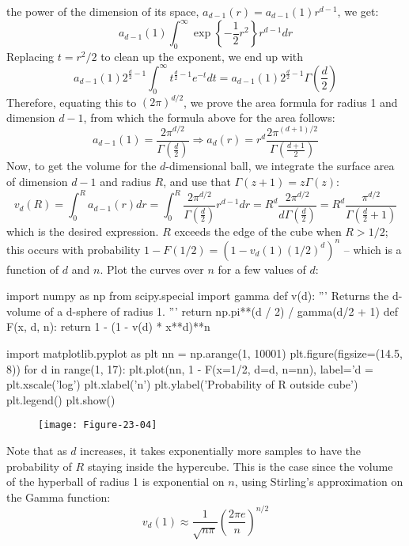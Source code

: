 the power of the dimension of its space,
\(a_{d-1}(r) = a_{d-1}(1) r^{d-1}\), we get:
\[
a_{d-1}(1) \int_{0}^{\infty} \exp \left\{ -\frac{1}{2} r^{2} \right\} r^{d - 1} dr
\]
Replacing \(t = r^{2} / 2\) to clean up the exponent, we end up with
\[
a_{d-1}(1) 2^{\frac{d}{2} - 1} \int_{0}^{\infty} t^{\frac{d}{2} - 1} e^{-t}  dt = a_{d-1}(1) 2^{\frac{d}{2} - 1} \Gamma \left( \frac{d}{2} \right)
\]
Therefore, equating this to \((2 \pi)^{d/2}\), we prove the area formula
for radius 1 and dimension \(d - 1\), from which the formula above for
the area follows:
\[
a_{d - 1}(1) = \frac{2 \pi^{d/2}}{\Gamma \left( \frac{d}{2}\right)} \Longrightarrow a_d(r) = r^{d} \frac{2 \pi^{(d + 1)/2}}{\Gamma \left( \frac{d + 1}{2}\right)}
\]
Now, to get the volume for the \(d\)-dimensional ball, we integrate the
surface area of dimension \(d-1\) and radius \(R\), and use that
\(\Gamma(z + 1) = z \Gamma(z)\):
\[
v_d(R) = \int_{0}^R a_{d-1}(r) dr = \int_{0}^R \frac{2 \pi^{d/2}}{\Gamma \left( \frac{d}{2}\right)} r^{d - 1} dr = R^{d} \frac{2 \pi^{d / 2}}{d \Gamma \left( \frac{d}{2} \right) } = R^{d} \frac{\pi^{d/2}}{\Gamma\left(\frac{d}{2} + 1\right)}
\]
which is the desired expression.
\(R\) exceeds the edge of the cube when \(R > 1/2\); this occurs with
probability \(1 - F(1/2) = \left(1 - v_d(1) (1/2)^{d}\right)^{n}\) -- which
is a function of \(d\) and \(n\). Plot the curves over \(n\) for a
few values of \(d\):

\begin{python}
import numpy as np
from scipy.special import gamma
def v(d):
    ''' Returns the d-volume of a d-sphere of radius 1. '''
    return np.pi**(d / 2) / gamma(d/2 + 1)
def F(x, d, n):
    return 1 - (1 - v(d) * x**d)**n
\end{python}

\begin{python}
import matplotlib.pyplot as plt
nn = np.arange(1, 10001)
plt.figure(figsize=(14.5, 8))
for d in range(1, 17):
    plt.plot(nn, 1 - F(x=1/2, d=d, n=nn), label='d = %
plt.xscale('log')
plt.xlabel('n')
plt.ylabel('Probability of R outside cube')
plt.legend()
plt.show()
\end{python}

\begin{figure}[H]
\centering
\texttt{[image: Figure-23-04]}
\end{figure}

Note that as \(d\) increases, it takes exponentially more samples to
have the probability of \(R\) staying inside the hypercube. This is the
case since the volume of the hyperball of radius 1 is exponential on
\(n\), using Stirling's approximation on the Gamma function:
\[
v_d(1) \approx \frac{1}{\sqrt{n \pi}} \left( \frac{2 \pi e}{n}\right)^{n/2}
\]

